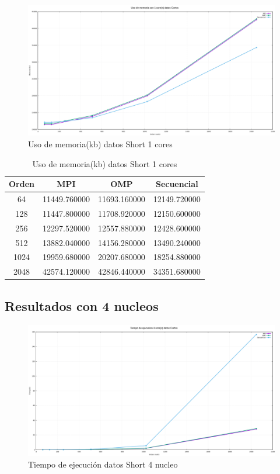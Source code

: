 \documentclass[10pt]{IEEEtran}
\begin{document}
\begin{figure}[H]
  \centering
  \includegraphics[width=0.95\linewidth]{figs/1nucleoCortosMemoria.png}
  \caption{Uso de memoria(kb) datos Short 1 cores}
  \label{fig:cor2}
\end{figure}

\begin{table}[H]
  \caption{Uso de memoria(kb) datos Short 1 cores}
  \label{table_example}
  \centering
  \begin{tabular}{|c|c|c|c|}
    \hline
    \textbf{Orden} & \textbf{MPI} & \textbf{OMP} & \textbf{Secuencial} \\
    \hline
    64 & 11449.760000 & 11693.160000 & 12149.720000 \\
    128 & 11447.800000 & 11708.920000 & 12150.600000 \\
    256 & 12297.520000 & 12557.880000 & 12428.600000 \\
    512 & 13882.040000 & 14156.280000 & 13490.240000 \\
    1024 & 19959.680000 & 20207.680000 & 18254.880000 \\
    2048 & 42574.120000 & 42846.440000 & 34351.680000 \\
    \hline
  \end{tabular}
\end{table}

\subsection{Resultados con 4 nucleos}

\begin{figure}[H]
  \centering
  \includegraphics[width=0.95\linewidth]{figs/4nucleosCortosTiempo.png}
  \caption{Tiempo de ejecución datos Short 4 nucleo}
  \label{fig:c}
\end{figure}
\end{document}
